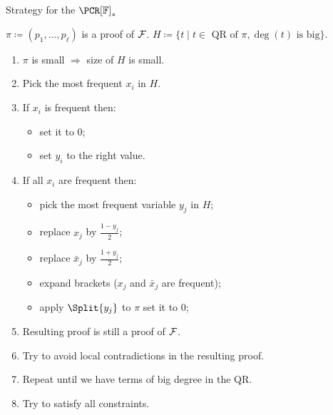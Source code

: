 \begin{frame}{Strategy for the $\PCR[\field]_*$}

    $\pi \coloneqq (p_1, \dots, p_{\ell})$ is a proof of $\mathcal{F}$. $H \coloneqq \{t \mid t \in \text{ QR of }
    \pi, \deg(t) \text{ is big}\}$.

    \begin{enumerate}
        \item $\pi$ is small $\Rightarrow$ size of $H$ is small.
        \pause
        \item Pick the most frequent  $x_i$ in $H$.
        \pause
        \item If $x_i$ is frequent then:
            \begin{itemize}
                \item set it to $0$;
                \item set $y_i$ to the right value.
            \end{itemize}
        \pause
        \item If all $x_i$ are  frequent then:
            \begin{itemize}
                \item pick the most frequent variable $y_j$ in $H$;
                \item replace $x_j$ by $\frac{1 - y_j}{2}$;
                \item replace $\bar{x}_j$ by $\frac{1 + y_j}{2}$;
                \item expand brackets ($x_j$ and $\bar{x}_j$ are  frequent);
                \item apply $\Split{y_j}$ to $\pi$ set it to $0$;
            \end{itemize}
        \item Resulting proof is still a proof of  $\mathcal{F}$.
        \pause
        \item Try to avoid local contradictions in the resulting proof. 
        \pause
        \item Repeat until we have terms of big degree in the QR.
        \vspace{0.3cm}
        \pause
        \item Try to satisfy all  constraints.
    \end{enumerate}
\end{frame}